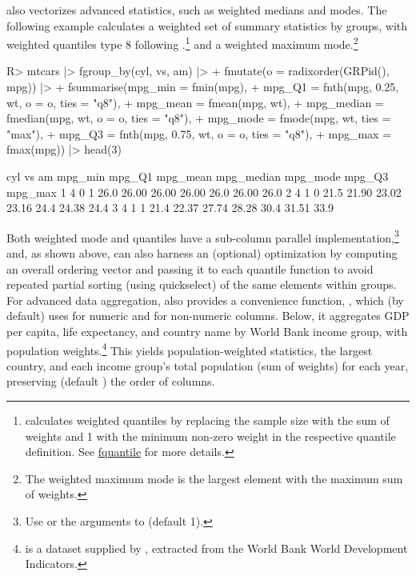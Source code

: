 \documentclass[article]{jss}
\newcommand{\fct}[1]{\code{#1()}}
\begin{document}
 also vectorizes advanced statistics, such as weighted medians and modes. The following example calculates a weighted set of summary statistics by groups, with weighted quantiles type 8 following \citet{hyndman1996sample}.\footnote{ calculates weighted quantiles by replacing the sample size with the sum of weights and 1 with the minimum non-zero weight in the respective quantile definition. See \href{https://sebkrantz.github.io/collapse/reference/fquantile.html}{fquantile} for more details.} and a weighted maximum mode.\footnote{The weighted maximum mode is the largest element with the maximum sum of weights.}
%
\begin{Schunk}
\begin{Sinput}
R> mtcars |> fgroup_by(cyl, vs, am) |>
+    fmutate(o = radixorder(GRPid(), mpg)) |>
+    fsummarise(mpg_min = fmin(mpg),
+               mpg_Q1 = fnth(mpg, 0.25, wt, o = o, ties = "q8"),
+               mpg_mean = fmean(mpg, wt),
+               mpg_median = fmedian(mpg, wt, o = o, ties = "q8"),
+               mpg_mode = fmode(mpg, wt, ties = "max"),
+               mpg_Q3 = fnth(mpg, 0.75, wt, o = o, ties = "q8"),
+               mpg_max = fmax(mpg)) |> head(3)
\end{Sinput}
\begin{Soutput}
  cyl vs am mpg_min mpg_Q1 mpg_mean mpg_median mpg_mode mpg_Q3 mpg_max
1   4  0  1    26.0  26.00    26.00      26.00     26.0  26.00    26.0
2   4  1  0    21.5  21.90    23.02      23.16     24.4  24.38    24.4
3   4  1  1    21.4  22.37    27.74      28.28     30.4  31.51    33.9
\end{Soutput}
\end{Schunk}
%
Both weighted mode and quantiles have a sub-column parallel implementation,\footnote{Use  or the  arguments to  (default 1).} and, as shown above, can also harness an (optional) optimization by computing an overall ordering vector and passing it to each quantile function to avoid repeated partial sorting (using quickselect) of the same elements within groups. For advanced data aggregation,  also provides a convenience function, \fct{collap}, which (by default) uses  for numeric and  for non-numeric columns. Below, it aggregates GDP per capita, life expectancy, and country name by World Bank income group, with population weights.\footnote{\href{https://sebkrantz.github.io/collapse/reference/wlddev.html}{} is a dataset supplied by , extracted from the World Bank World Development Indicators.} This yields population-weighted statistics, the largest country, and each income group's total population (sum of weights) for each year, preserving (default ) the order of columns.
\end{document}
